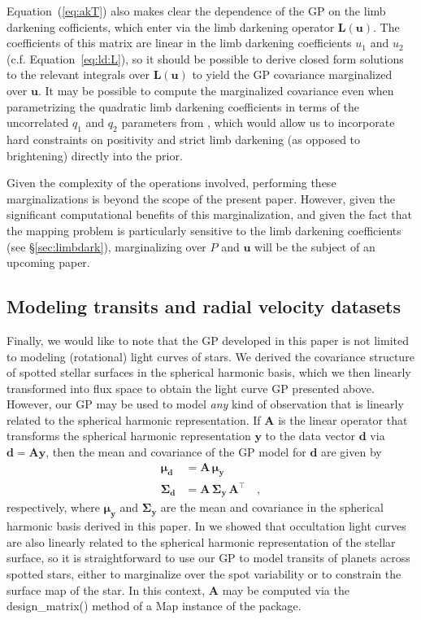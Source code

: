 \documentclass[modern]{aastex62}
\begin{document}
Equation~(\ref{eq:akT}) also makes clear the dependence of the GP on
the limb darkening cofficients, which enter via the limb darkening
operator $\mathbf{L}(\mathbf{u})$. The coefficients
of this matrix are linear in the limb darkening coefficients $u_1$ and $u_2$
(c.f. Equation~\ref{eq:ld:L}), so it should be possible to derive closed
form solutions to the relevant integrals over $\mathbf{L}(\mathbf{u})$ to
yield the GP covariance marginalized over $\mathbf{u}$. It may be
possible to compute the marginalized covariance even when parametrizing
the quadratic limb darkening
coefficients in terms of the uncorrelated $q_1$ and $q_2$ parameters from
\citet{Kipping2013}, which would allow us to incorporate hard constraints on positivity
and strict limb darkening (as opposed to brightening) directly into the prior.

Given the complexity of the operations involved,
performing these marginalizations is beyond the scope of the present paper.
However, given the significant computational benefits of this marginalization,
and given the fact that the mapping problem is particularly sensitive to
the limb darkening coefficients (see \S\ref{sec:limbdark}), marginalizing over
$P$ and $\mathbf{u}$ will be the subject of an upcoming paper.

\subsection{Modeling transits and radial velocity datasets}
\label{sec:transits-rvs}

Finally, we would like to note that the GP developed in this paper is not
limited to modeling (rotational) light curves of stars. We derived the
covariance structure of spotted stellar surfaces in the spherical harmonic
basis, which we then linearly transformed into flux space to obtain the
light curve GP presented above. However, our GP may be used to model
\emph{any} kind of observation that
is linearly related to the spherical harmonic representation. If $\mathbf{A}$
is the linear operator that transforms the spherical harmonic representation
$\mathbf{y}$ to the data vector $\mathbf{d}$ via
$\mathbf{d} = \mathbf{A} \mathbf{y}$, then the mean and covariance of the
GP model for $\mathbf{d}$ are given by
%
\begin{align}
    \pmb{\mu}_\mathbf{d}    & = \mathbf{A} \, \pmb{\mu}_\mathbf{y}
    \\
    \pmb{\Sigma}_\mathbf{d} & = \mathbf{A} \, \pmb{\Sigma}_\mathbf{y} \, \mathbf{A}^\top
    \quad,
\end{align}
%
respectively, where $\pmb{\mu}_\mathbf{y}$ and $\pmb{\Sigma}_\mathbf{y}$
are the mean and covariance in the spherical harmonic basis derived in this paper.
In \citet{Luger2019} we showed that
occultation light curves are also linearly related to the
spherical harmonic representation of the stellar surface, so it is
straightforward to use our GP to model transits of planets across spotted
stars, either to marginalize over the spot variability or to constrain the
surface map of the star. In this context, $\mathbf{A}$ may be computed via the
\textsf{design\_matrix()} method of a \textsf{Map} instance of the \starry
package.
\end{document}
